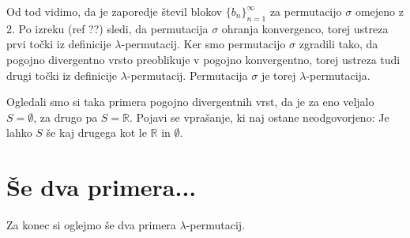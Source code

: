 \documentclass[12pt,a4paper,reqno]{amsart}
\theoremstyle{definition} %
\theoremstyle{plain} %
\newcommand{\R}{\mathbb R}
\begin{document}
Od tod vidimo, da je zaporedje števil blokov $\{b_n\}_{n=1}^{\infty}$ za permutacijo $\sigma$ omejeno z $2$. %
Po izreku (ref ??) sledi, da permutacija $\sigma$ ohranja konvergenco, torej ustreza prvi točki iz definicije $\lambda$-permutacij. Ker smo permutacijo $\sigma$ zgradili tako, da pogojno divergentno vrsto preoblikuje v pogojno konvergentno, torej ustreza tudi drugi točki iz definicije $\lambda$-permutacij. Permutacija $\sigma$ je torej $\lambda$-permutacija.

Ogledali smo si taka primera pogojno divergentnih vrst, da je za eno veljalo $S=\emptyset$, za drugo pa $S=\R$. Pojavi se vprašanje, ki naj ostane neodgovorjeno: Je lahko $S$ še kaj drugega kot le $\R$ in $\emptyset$.

\section{Še dva primera...}

Za konec si oglejmo še dva primera $\lambda$-permutacij.
\end{document}
